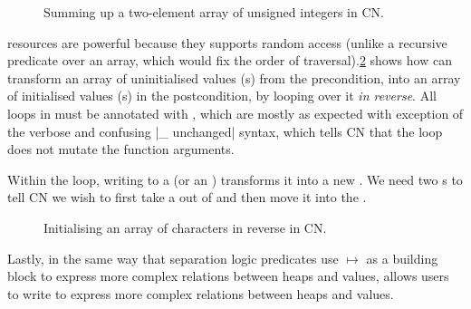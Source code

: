 \begin{figure}[tp]
    \centering
    \begin{minipage}{1.5\textwidth}
    \end{minipage}
    \caption{Summing up a two-element array of unsigned integers in
        CN.}\label{fig:owned-array}
\end{figure}

 resources are powerful because they supports random access
(unlike a recursive predicate over an array, which would fix the order of
traversal).\cref{fig:init-arr-rev} shows how  can transform an array of
uninitialised values (s) from the precondition, into an array
of initialised values (s) in the postcondition, by looping over
it \emph{in reverse}. All loops in  must be annotated with , which are mostly as expected with exception of the verbose and
confusing \cninline|{_} unchanged|
syntax,
which tells CN that the loop does not mutate the function arguments.

Within the loop, writing to a  (or an ) transforms
it into a new . We need two s to tell CN we
wish to first take a  out of  and then move
it into the .

\begin{figure}[tp]
    \centering
    \begin{minipage}{1.5\textwidth}
    \end{minipage}
    \caption{Initialising an array of characters in reverse in
        CN.}\label{fig:init-arr-rev}
\end{figure}

Lastly, in the same way that separation logic predicates use $\mapsto$ as a
building block to express more complex relations between heaps and 
values,  allows users to write  to express
more complex relations between heaps and  values.

